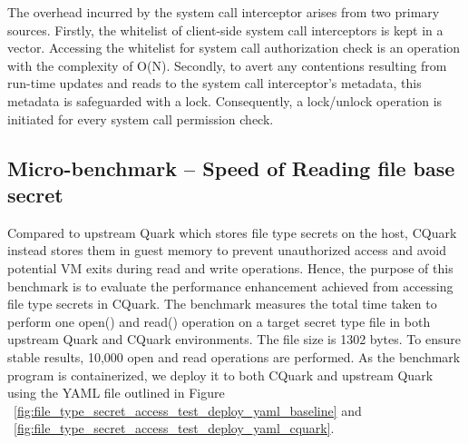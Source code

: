 The overhead incurred by the system call interceptor arises from two primary sources. Firstly, the whitelist of client-side system call interceptors is kept in a vector. Accessing the whitelist for system call authorization check is an operation with the complexity of O(N). Secondly, to avert any contentions resulting from run-time updates and reads to the system call interceptor's metadata, this metadata is safeguarded with a lock. Consequently, a lock/unlock operation is initiated for every system call permission check.



\subsection{Micro-benchmark – Speed of Reading file base secret}

Compared to upstream Quark which stores file type secrets on the host, CQuark instead stores them in guest memory to prevent unauthorized access and avoid potential VM exits during read and write operations. Hence, the purpose of this benchmark is to evaluate the performance enhancement achieved from 
accessing file type secrets in CQuark. The benchmark measures the total time taken to perform one open() and read() operation on a target secret type file in both upstream Quark and CQuark environments. The file size is 1302 bytes. To ensure stable results, 10,000 open and read operations are performed.
As the benchmark program is containerized, we deploy it to both CQuark and upstream Quark using the YAML file outlined in Figure ~\ref{fig:file_type_secret_access_test_deploy_yaml_baseline} and ~\ref{fig:file_type_secret_access_test_deploy_yaml_cquark}.


% 

